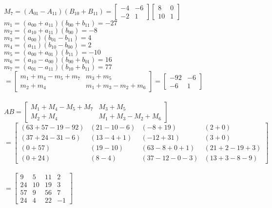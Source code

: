 \documentclass[letterpaper,10pt]{article}
\begin{document}
\begin{flushleft}
$M_7=(A_{01}-A_{11})(B_{10}+B_{11})=
\left[ 
	\begin{array}{cc}
		-4 & -6\\
		-2 & 1 
	\end{array} 
\right]
\left[ 
	\begin{array}{cc}
		8 & 0\\
		10 & 1 
	\end{array} 
\right]$\\
	$m_1=(a_{00}+a_{11})(b_{00}+b_{11})=-27$\\
	$m_2=(a_{10}+a_{11})(b_{00})=-8$\\
	$m_3=(a_{00})(b_{01}-b_{11})=4$\\
	$m_4=(a_{11})(b_{10}-b_{00})=2$\\
	$m_5=(a_{00}+a_{01})(b_{11})=-10$\\
	$m_6=(a_{10}-a_{00})(b_{00}+b_{01})=16$\\
	$m_7=(a_{01}-a_{11})(b_{10}+b_{11})=77$\\
$=
\left[ 
	\begin{array}{cc}
		m_1+m_4-m_5+m_7 & m_3+m_5\\
		m_2+m_4 & m_1+m_3-m_2+m_6 
	\end{array} 
\right]	=
	\left[ 
		\begin{array}{cc}
			-92 & -6\\
			-6 & 1 
		\end{array} 
	\right]$\\
~\\
$AB=
	\left[ 
		\begin{array}{cc}
			M_1+M_4- M_5+M_7 & M_3+M_5\\
			M_2+M_4 & M_1+M_3-M_2+M_6 
		\end{array} 
	\right]$ 
~\\
$=
\left[ 
	\begin{array}{cccc}
		(63+57-19-92) & (21-10-6) & (-8+19) & (2+0)\\
		(37+24-31-6) & (13-4+1) & (-12+31) & (3+0)\\
		(0+57) & (19-10) & (63-8+0+1) & (21+2-19+3)\\
		(0+24) & (8-4) & (37-12-0-3) & (13+3-8-9) 
	\end{array} 
\right]
$
~\\
$=
\left[ 
	\begin{array}{cccc}
		9 & 5 & 11 & 2\\
		24 & 10 & 19 & 3\\
		57 & 9 & 56 & 7\\
		24 & 4 & 22 & -1 
	\end{array} 
\right]$

\end{flushleft}
\end{document}

